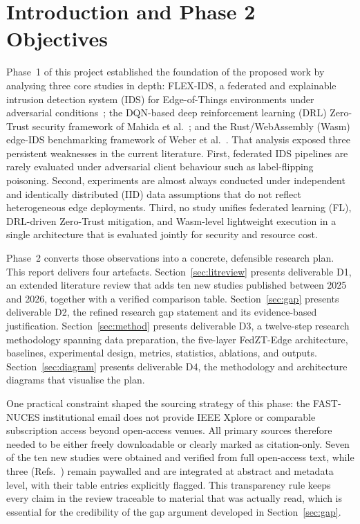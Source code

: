 \documentclass[11pt,a4paper]{article}
\newcommand{\bigsection}[1]{\Needspace*{0.22\textheight}\section{#1}}
\begin{document}
\tableofcontents
\newpage

\bigsection{Introduction and Phase 2 Objectives}\label{sec:intro}

Phase~1 of this project established the foundation of the proposed work by
analysing three core studies in depth: FLEX-IDS, a federated and explainable
intrusion detection system (IDS) for Edge-of-Things environments under
adversarial conditions~\cite{flexids}; the DQN-based deep reinforcement
learning (DRL) Zero-Trust security framework of Mahida et
al.~\cite{mahida2026}; and the Rust/WebAssembly (Wasm) edge-IDS benchmarking
framework of Weber et al.~\cite{weber2026}. That analysis exposed three
persistent weaknesses in the current literature. First, federated IDS
pipelines are rarely evaluated under adversarial client behaviour such as
label-flipping poisoning. Second, experiments are almost always conducted
under independent and identically distributed (IID) data assumptions that do
not reflect heterogeneous edge deployments. Third, no study unifies
federated learning (FL), DRL-driven Zero-Trust mitigation, and
Wasm-level lightweight execution in a single architecture that is evaluated
jointly for security and resource cost.

Phase~2 converts those observations into a concrete, defensible research
plan. This report delivers four artefacts. Section~\ref{sec:litreview}
presents deliverable D1, an extended literature review that adds ten new
studies published between 2025 and 2026, together with a verified comparison
table. Section~\ref{sec:gap} presents deliverable D2, the refined research
gap statement and its evidence-based justification.
Section~\ref{sec:method} presents deliverable D3, a twelve-step research
methodology spanning data preparation, the five-layer FedZT-Edge
architecture, baselines, experimental design, metrics, statistics,
ablations, and outputs. Section~\ref{sec:diagram} presents deliverable D4,
the methodology and architecture diagrams that visualise the plan.

One practical constraint shaped the sourcing strategy of this phase: the
FAST-NUCES institutional email does not provide IEEE Xplore or comparable
subscription access beyond open-access venues. All primary sources
therefore needed to be either freely downloadable or clearly marked as
citation-only. Seven of the ten new studies were obtained and verified from
full open-access text, while three (Refs.~\cite{rezaei2025,bensaid2025,nandanwar2025})
remain paywalled and are integrated at abstract and metadata level, with
their table entries explicitly flagged. This transparency rule keeps every
claim in the review traceable to material that was actually read, which is
essential for the credibility of the gap argument developed in
Section~\ref{sec:gap}.
\end{document}
